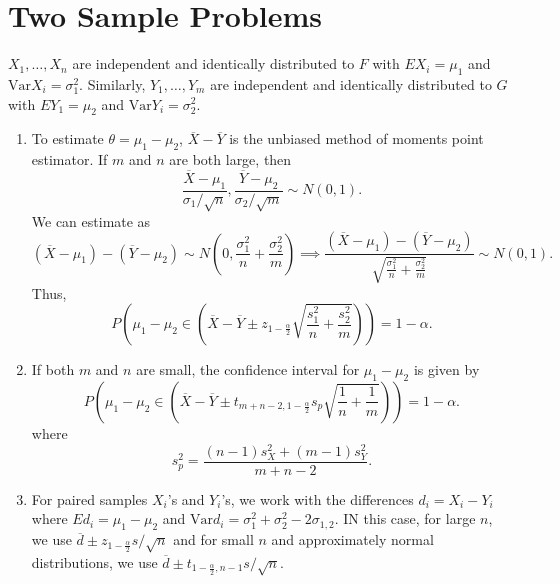 \documentclass[15pt,a4paper]{book}
\theoremstyle{definition}
\begin{document}
\section{Two Sample Problems}

$X_{1},\ldots,X_{n}$ are independent and identically distributed to $F$ with $EX_{i} = \mu_{1}$ and $\text{Var}X_{i} = \sigma_{1}^{2}$. Similarly, $Y_{1},\ldots,Y_{m}$ are independent and identically distributed to $G$ with $EY_{1} = \mu_{2}$ and $\text{Var}Y_{i} = \sigma_{2}^{2}$.
\begin{enumerate}
    \item To estimate $\theta = \mu_{1} - \mu_{2}$, $\overline{X}-\overline{Y}$ is the unbiased method of moments point estimator. If $m$ and $n$ are both large, then
    \begin{equation}
        \frac{\overline{X}-\mu_{1}}{\sigma_{1}/\sqrt{n}}, \frac{\overline{Y}-\mu_{2}}{\sigma_{2}/\sqrt{m}} \sim N(0,1).
    \end{equation}
    We can estimate as
    \begin{equation}
        (\overline{X}-\mu_{1})-(\overline{Y}-\mu_{2}) \sim N(0,\frac{\sigma_{1}^{2}}{n}+\frac{\sigma_{2}^{2}}{m}) \implies \frac{(\overline{X}-\mu_{1})-(\overline{Y}-\mu_{2})}{\sqrt{\frac{\sigma_{1}^{2}}{n}+\frac{\sigma_{2}^{2}}{m}}} \sim N(0,1).
    \end{equation}
    Thus,
    \begin{equation}
        P(\mu_{1}-\mu_{2} \in (\overline{X}-\overline{Y} \pm z_{1-\frac{\alpha}{2}} \sqrt{\frac{s_{1}^{2}}{n} + \frac{s_{2}^{2}}{m}})) = 1-\alpha.
    \end{equation}

    \item If both $m$ and $n$ are small, the confidence interval for $\mu_{1} - \mu_{2}$ is given by
    \begin{equation}
        P\left( \mu_{1}-\mu_{2} \in (\overline{X}-\overline{Y} \pm t_{m+n-2,1-\frac{\alpha}{2}} s_{p} \sqrt{\frac{1}{n}+\frac{1}{m}}) \right) = 1 - \alpha.
    \end{equation}
    where
    \begin{equation}
        s_{p}^{2} = \frac{(n-1)s_{X}^{2} + (m-1)s_{Y}^{2}}{m+n-2}.
    \end{equation}

    \item For paired samples $X_{i}$'s and $Y_{i}$'s, we work with the differences $d_{i} = X_{i} - Y_{i}$ where $Ed_{i} = \mu_{1}-\mu_{2}$ and $\text{Var}d_{i} = \sigma_{1}^{2}+\sigma_{2}^{2}-2\sigma_{1,2}$. IN this case, for large $n$, we use $\overline{d} \pm z_{1-\frac{\alpha}{2}} s/\sqrt{n}$ and for small $n$ and approximately normal distributions, we use $\overline{d} \pm t_{1-\frac{\alpha}{2},n-1} s/\sqrt{n}$.
    

\end{enumerate}
\end{document}
